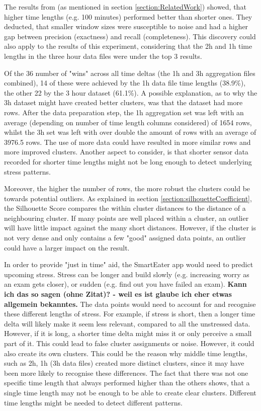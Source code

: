 The results from \textcite{AboutToEat2016Rahman} (as mentioned in section \ref{section:RelatedWork}) showed, that higher time lengths (e.g. 100 minutes) performed better than shorter ones. They deducted, that smaller window sizes were susceptible to noise and had a higher gap between precision (exactness) and recall (completeness). 
This discovery could also apply to the results of this experiment, considering that the 2h and 1h time lengths in the three hour data files were under the top 3 results.


Of the 36 number of "wins" across all time deltas (the 1h and 3h aggregation files combined), 14 of these were achieved by the 1h data file time lengths (38.9\%), the other 22 by the 3 hour dataset (61.1\%). A possible explanation, as to why the 3h dataset might have created better clusters, was that the dataset had more rows. After the data preparation step, the 1h aggregation set was left with an average (depending on number of time length columns considered) of 1654 rows, whilst the 3h set was left with over double the amount of rows with an average of 3976.5 rows. The use of more data could have resulted in more similar rows and more improved clusters. Another aspect to consider, is that shorter sensor data recorded for shorter time lengths might not be long enough to detect underlying stress patterns.

Moreover, the higher the number of rows, the more robust the clusters could be towards potential outliers. As explained in section \ref{section:silhouetteCoefficient}, the Silhouette Score compares the within cluster distances to the distance of a neighbouring cluster. If many points are well placed within a cluster, an outlier will have little impact against the many short distances. However, if the cluster is not very dense and only contains a few "good" assigned data points, an outlier could have a larger impact on the result.


In order to provide "just in time" aid, the SmartEater app would need to predict upcoming stress. Stress can be longer and build slowly (e.g. increasing worry as an exam gets closer), or sudden (e.g. find out you have failed an exam). \textbf{Kann ich das so sagen (ohne Zitat)? - weil es ist glaube ich eher etwas allgemein bekanntes.} The data points would need to account for and recognise these different lengths of stress. For example, if stress is short, then a longer time delta will likely make it seem less relevant, compared to all the unstressed data. However, if it is long, a shorter time delta might miss it or only perceive a small part of it. This could lead to false cluster assignments or noise. However, it could also create its own clusters. This could be the reason why middle time lengths, such as 2h, 1h (3h data files) created more distinct clusters, since it may have been more likely to recognise these differences. The fact that there was not one specific time length that always performed higher than the others shows, that a single time length may not be enough to be able to create clear clusters. Different time lengths might be needed to detect different patterns.

